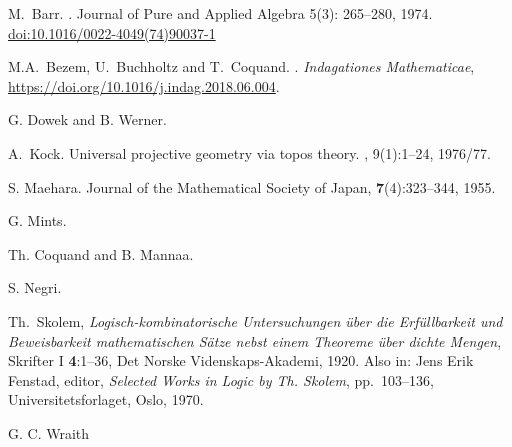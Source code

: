 \documentclass[10pt,a4paper]{article}
\begin{document}
\begin{thebibliography}{9}

 M.~Barr.
.
Journal of Pure and Applied Algebra 5(3): 265--280, 1974.
\url{doi:10.1016/0022-4049(74)90037-1}

M.A.~Bezem, U.~Buchholtz and T.~Coquand.
.
\newblock \emph{Indagationes Mathematicae}, 
\url{https://doi.org/10.1016/j.indag.2018.06.004}.


G. Dowek and B. Werner.



A.~Kock.
\newblock Universal projective geometry via topos theory.
, 9(1):1--24, 1976/77.

S. Maehara.
Journal of the Mathematical Society of Japan, \textbf{7}(4):323--344, 1955.

G. Mints.

Th. Coquand and B. Mannaa.

S. Negri.

Th.~Skolem,
\newblock\emph{Logisch-kombinatorische Untersuchungen \"{u}ber
die Erf\"{u}llbarkeit %
und Beweisbarkeit mathematischen S\"{a}tze
nebst einem Theoreme \"{u}ber dichte Mengen},
{Skrifter} I \textbf{4}:1--36, Det Norske Videnskaps-Akademi, 1920.
\newblock Also in: Jens Erik Fenstad, editor,
\emph{Selected Works in Logic by Th. Skolem}, pp.~103--136,
Universitetsforlaget, Oslo, 1970.

G. C. Wraith

\end{thebibliography}
\end{document}
